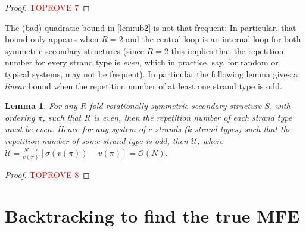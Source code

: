 \documentclass[11pt,letterpaper]{article}  \usepackage[margin=1in]{geometry}
\newtheorem{lemma}[theorem]{Lemma}
\theoremstyle{definition}  \newtheorem{Definition}[theorem]{Definition}
\begin{document}
\begin{proof}\textcolor{red}{TOPROVE 7}\end{proof}

The (bad) quadratic bound in \cref{lem:ub2} is not that frequent: 
In particular, that bound only appears when $R=2$ and the central loop is an internal loop for both symmetric secondary structures (since $R=2$ this implies that the repetition number for every strand type is {\em even}, which in practice, say, for random or typical systems, may not be frequent).   
In particular the following lemma gives a {\em linear} bound when the repetition number of at least one strand type is odd. 


\begin{lemma} \label{lem:even}
	For any $R$-fold rotationally symmetric  secondary structure $S$, with ordering $\pi$, such that $R$ is even, then the repetition number of each strand type must be even. Hence for any system of $c$ strands ($k$ strand types) such that the repetition number of some strand type is odd, then $\mathcal{U}$, where $\mathcal{U} =  \frac{N-c}{v(\pi)} \left[ \sigma(v(\pi))-v(\pi) \right] = \mathcal{O}(N)$. 
\end{lemma}
\begin{proof}\textcolor{red}{TOPROVE 8}\end{proof}




 	

\section{Backtracking to find the true MFE}\label{sec:BT}
\end{document}
